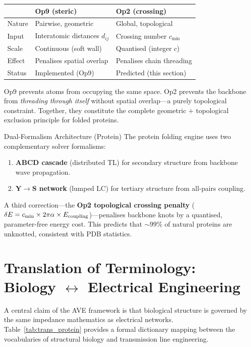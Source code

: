 \begin{center}
\renewcommand{\arraystretch}{1.2}
\begin{tabular}{l l l}
& \textbf{Op9 (steric)} & \textbf{Op2 (crossing)} \\
\hline
Nature & Pairwise, geometric & Global, topological \\
Input  & Interatomic distances $d_{ij}$ &
         Crossing number $c_{\min}$ \\
Scale  & Continuous (soft wall) &
         Quantised (integer $c$) \\
Effect & Penalises spatial overlap &
         Penalises chain threading \\
Status & Implemented (Op9) &
         Predicted (this section) \\
\end{tabular}
\end{center}

\noindent Op9 prevents atoms from occupying the same space.
Op2 prevents the backbone from \emph{threading through
itself} without spatial overlap---a purely topological
constraint.  Together, they constitute the complete
geometric $+$ topological exclusion principle for folded
proteins.

\begin{resultbox}{Dual-Formalism Architecture (Protein)}
The protein folding engine uses two complementary
solver formalisms:
\begin{enumerate}
    \item \textbf{ABCD cascade} (distributed TL) for
          secondary structure from backbone wave
          propagation.
    \item \textbf{Y$\to$S network} (lumped LC) for
          tertiary structure from all-pairs coupling.
\end{enumerate}
A third correction---the \textbf{Op2 topological
crossing penalty} ($\delta E = c_{\min} \times 2\pi\alpha
\times E_{\rm coupling}$)---penalises backbone knots by a
quantised, parameter-free energy cost.  This predicts
that $\sim 99\%$ of natural proteins are unknotted,
consistent with PDB statistics.
\end{resultbox}


\section{Translation of Terminology: Biology $\leftrightarrow$ Electrical Engineering}
\label{sec:terminology}

A central claim of the AVE framework is that biological structure is governed by the same impedance mathematics as electrical networks. Table~\ref{tab:trans_protein} provides a formal dictionary mapping between the vocabularies of structural biology and transmission line engineering.

